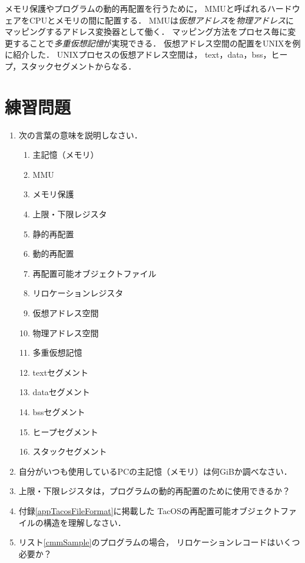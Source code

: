 メモリ保護やプログラムの動的再配置を行うために，
MMUと呼ばれるハードウェアをCPUとメモリの間に配置する．
MMUは\emph{仮想アドレス}を\emph{物理アドレス}に
マッピングするアドレス変換器として働く．
マッピング方法をプロセス毎に変更することで\emph{多重仮想記憶}が実現できる．
仮想アドレス空間の配置をUNIXを例に紹介した．
UNIXプロセスの仮想アドレス空間は，
text，data，bss，ヒープ，スタックセグメントからなる．

\section*{練習問題}
\begin{enumerate}
  \renewcommand{\labelenumi}{\ttfamily\arabic{chapter}.\arabic{enumi}}
  \setlength{\leftskip}{1em}
\item 次の言葉の意味を説明しなさい．
  \begin{enumerate}
  \item 主記憶（メモリ）
  \item MMU
  \item メモリ保護
  \item 上限・下限レジスタ
  \item 静的再配置
  \item 動的再配置
  \item 再配置可能オブジェクトファイル
  \item リロケーションレジスタ
  \item 仮想アドレス空間
  \item 物理アドレス空間
  \item 多重仮想記憶
  \item textセグメント
  \item dataセグメント
  \item bssセグメント
  \item ヒープセグメント
  \item スタックセグメント
  \end{enumerate}
\item 自分がいつも使用しているPCの主記憶（メモリ）は何GiBか調べなさい．
\item 上限・下限レジスタは，プログラムの動的再配置のために使用できるか？
\item 付録\ref{appTacosFileFormat}に掲載した
  TacOSの再配置可能オブジェクトファイルの構造を理解しなさい．
\item リスト\ref{cmmSample}のプログラムの場合，
  リロケーションレコードはいくつ必要か？
\end{enumerate}
